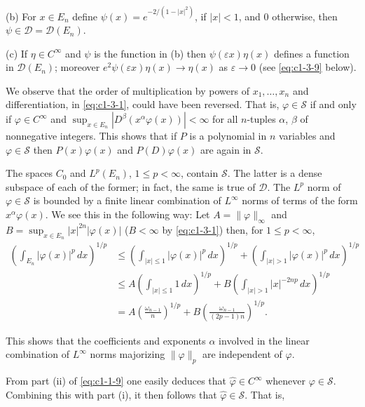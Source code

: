 \textup{(b)} For $x \in E_{n}$ define $\psi(x) = e^{-2/(1 - |x|^{2})}$, if
$|x| < 1$, and $0$ otherwise, then $\psi \in \mathscr{D} = \mathscr{D}(E_{n})$.

\textup{(c)} If $\eta \in C^{\infty}$ and $\psi$ is the function in (b) then
$\psi(\varepsilon x)\eta(x)$ defines a function in $\mathscr{D}(E_{n})$;
moreover $e^{2}\psi(\varepsilon x)\eta(x) \to \eta(x)$ as $\varepsilon \to 0$
(see \eqref{eq:c1-3-9} below).

We observe that the order of multiplication by powers of $x_{1}, \ldots, x_{n}$
and differentiation, in \eqref{eq:c1-3-1}, could have been reversed. That is,
$\varphi \in \mathscr{S}$ if and only if $\varphi \in C^{\infty}$ and
$\sup_{x \in E_{n}} |D^{\beta}(x^{\alpha}\varphi(x))| < \infty$ for all
$n$-tuples $\alpha$, $\beta$ of nonnegative integers. This shows that if $P$
is a polynomial in $n$ variables and $\varphi \in \mathscr{S}$ then
$P(x)\varphi(x)$ and $P(D)\varphi(x)$ are again in $\mathscr{S}$.

The spaces $C_{0}$ and $L^{p}(E_{n})$, $1 \leq p < \infty$, contain
$\mathscr{S}$. The latter is a dense subspace of each of the former; in fact,
the same is true of $\mathscr{D}$. The $L^{p}$ norm of $\varphi \in \mathscr{S}$
is bounded by a finite linear combination of $L^{\infty}$ norms of terms of
the form $x^{\alpha}\varphi(x)$. We see this in the following way: Let
$A = \|\varphi\|_{\infty}$ and
$B = \sup_{x \in E_{n}} |x|^{2n}|\varphi(x)|$ ($B < \infty$ by
\eqref{eq:c1-3-1}) then, for $1 \leq p < \infty$,
\begin{align*}
\left(\int_{E_{n}}|\varphi(x)|^{p}\,dx\right)^{1/p}
&\leq\left(\int_{|x|\leq1}|\varphi(x)|^{p}\,dx\right)^{1/p}
+\left(\int_{|x|>1}|\varphi(x)|^{p}\,dx\right)^{1/p}\\
&\leq A\left(\int_{|x|\leq1}1\,dx\right)^{1/p}
+B\left(\int_{|x|>1}|x|^{-2np}\,dx\right)^{1/p}\\
&=A\left(\frac{\omega_{n-1}}{n}\right)^{1/p}
+B\left(\frac{\omega_{n-1}}{(2p-1)n}\right)^{1/p}.
\end{align*}

This shows that the coefficients and exponents $\alpha$ involved in the linear
combination of $L^{\infty}$ norms majorizing $\|\varphi\|_{p}$ are independent
of $\varphi$.

From part (ii) of \eqref{eq:c1-1-9} one easily deduces that
$\hat{\varphi} \in C^{\infty}$ whenever $\varphi \in \mathscr{S}$. Combining
this with part (i), it then follows that $\hat{\varphi} \in \mathscr{S}$. That
is,

